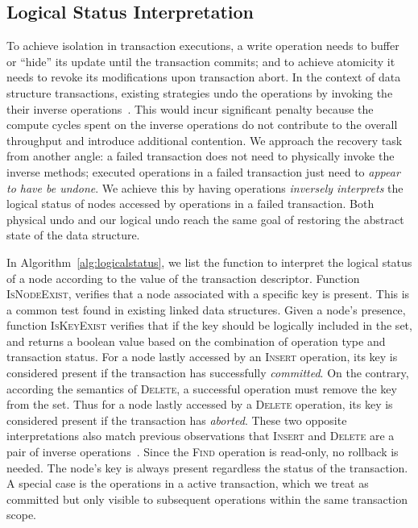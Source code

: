\documentclass[]{sig-alternate-05-2015}
\begin{document}
\subsection{Logical Status Interpretation}
\label{sec:logical}
To achieve isolation in transaction executions, a write operation needs to buffer or ``hide'' its update until the transaction commits; and to achieve atomicity it needs to revoke its modifications upon transaction abort.
In the context of data structure transactions, existing strategies undo the operations by invoking the their inverse operations~\cite{herlihy2008transactional}.
This would incur significant penalty because the compute cycles spent on the inverse operations do not contribute to the overall throughput and introduce additional contention.
We approach the recovery task from another angle: a failed transaction does not need to physically invoke the inverse methods; executed operations in a failed transaction just need to \emph{appear to have be undone}.
We achieve this by having operations \emph{inversely interprets} the logical status of nodes accessed by operations in a failed transaction.
Both physical undo and our logical undo reach the same goal of restoring the abstract state of the data structure. 

In Algorithm~\ref{alg:logicalstatus}, we list the function to interpret the logical status of a node according to the value of the transaction descriptor.
Function \textsc{IsNodeExist}, verifies that a node associated with a specific key is present.
This is a common test found in existing linked data structures.
Given a node's presence, function \textsc{IsKeyExist} verifies that if the key should be logically included in the set, and returns a boolean value based on the combination of operation type and transaction status.
For a node lastly accessed by an \textsc{Insert} operation, its key is considered present if the transaction has successfully \emph{committed}.
On the contrary, according the semantics of \textsc{Delete}, a successful operation must remove the key from the set.
Thus for a node lastly accessed by a \textsc{Delete} operation, its key is considered present if the transaction has \emph{aborted}.
These two opposite interpretations also match previous observations that \textsc{Insert} and \textsc{Delete} are a pair of inverse operations~\cite{herlihy2008transactional}.
Since the \textsc{Find} operation is read-only, no rollback is needed.
The node's key is always present regardless the status of the transaction.
A special case is the operations in a active transaction, which we treat as committed but only visible to subsequent operations within the same transaction scope.
\end{document}
